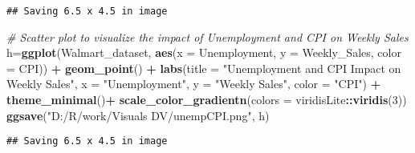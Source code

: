 \documentclass[
]{article}
\newenvironment{Shaded}{\begin{snugshade}}{\end{snugshade}}
\newcommand{\AttributeTok}[1]{\textcolor[rgb]{0.13,0.29,0.53}{#1}}
\newcommand{\CommentTok}[1]{\textcolor[rgb]{0.56,0.35,0.01}{\textit{#1}}}
\newcommand{\DecValTok}[1]{\textcolor[rgb]{0.00,0.00,0.81}{#1}}
\newcommand{\FunctionTok}[1]{\textcolor[rgb]{0.13,0.29,0.53}{\textbf{#1}}}
\newcommand{\NormalTok}[1]{#1}
\newcommand{\OtherTok}[1]{\textcolor[rgb]{0.56,0.35,0.01}{#1}}
\newcommand{\SpecialCharTok}[1]{\textcolor[rgb]{0.81,0.36,0.00}{\textbf{#1}}}
\newcommand{\StringTok}[1]{\textcolor[rgb]{0.31,0.60,0.02}{#1}}
\begin{document}
\begin{verbatim}
## Saving 6.5 x 4.5 in image
\end{verbatim}

\begin{Shaded}
\begin{Highlighting}[]
\CommentTok{\# Scatter plot to visualize the impact of Unemployment and CPI on Weekly Sales}
\NormalTok{h}\OtherTok{=}\FunctionTok{ggplot}\NormalTok{(Walmart\_dataset, }\FunctionTok{aes}\NormalTok{(}\AttributeTok{x =}\NormalTok{ Unemployment, }\AttributeTok{y =}\NormalTok{ Weekly\_Sales, }
                              \AttributeTok{color =}\NormalTok{ CPI)) }\SpecialCharTok{+}
  \FunctionTok{geom\_point}\NormalTok{() }\SpecialCharTok{+}
  \FunctionTok{labs}\NormalTok{(}\AttributeTok{title =} \StringTok{"Unemployment and CPI Impact on Weekly Sales"}\NormalTok{,}
       \AttributeTok{x =} \StringTok{"Unemployment"}\NormalTok{,}
       \AttributeTok{y =} \StringTok{"Weekly Sales"}\NormalTok{,}
       \AttributeTok{color =} \StringTok{"CPI"}\NormalTok{) }\SpecialCharTok{+}
  \FunctionTok{theme\_minimal}\NormalTok{()}\SpecialCharTok{+}
  \FunctionTok{scale\_color\_gradientn}\NormalTok{(}\AttributeTok{colors =}\NormalTok{ viridisLite}\SpecialCharTok{::}\FunctionTok{viridis}\NormalTok{(}\DecValTok{3}\NormalTok{))}
\FunctionTok{ggsave}\NormalTok{(}\StringTok{"D:/R/work/Visuals DV/unempCPI.png"}\NormalTok{, h)}
\end{Highlighting}
\end{Shaded}

\begin{verbatim}
## Saving 6.5 x 4.5 in image
\end{verbatim}
\end{document}
